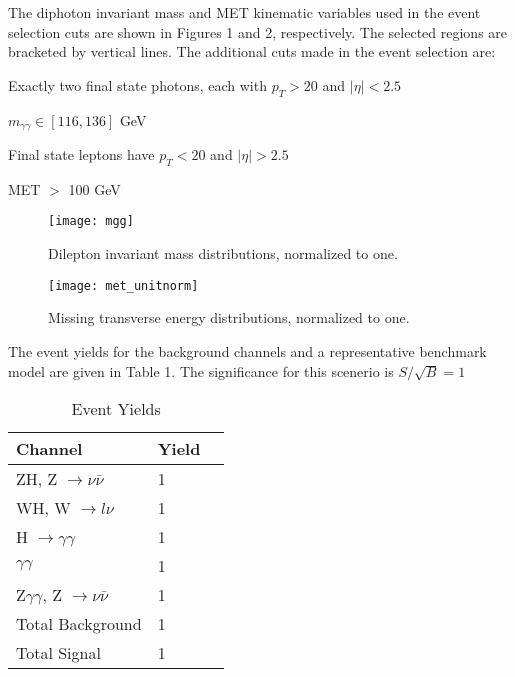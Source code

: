 \documentclass[twoside]{article}
\begin{document}
\begin{multicols}{2}
The diphoton invariant mass and MET kinematic variables used in the event selection cuts are shown in Figures 1 and 2, respectively. The selected regions are bracketed by vertical lines. The additional cuts made in the event selection are: \\
 
\begin{compactitem}
\item Exactly two final state photons, each with $p_{T} > 20$ and $|\eta| < 2.5$
\item $m_{\gamma\gamma} \in [116, 136]$ GeV
\item Final state leptons have $p_{T} < 20$ and $|\eta| > 2.5$
\item MET $>$ 100 GeV
\end{compactitem}

\begin{figure}[H]
\centering
\texttt{[image: mgg]}
\caption{Dilepton invariant mass distributions, normalized to one.}
\end{figure}

\begin{figure}[H]
\centering
\texttt{[image: met\_unitnorm]}
\caption{Missing transverse energy distributions, normalized to one.}
\end{figure}

The event yields for the background channels and a representative benchmark model are given in Table 1. The significance for this scenerio is $S / \sqrt{B} = 1$ \\

\begin{table}[H]
\centering
\begin{tabular}{llr}
\toprule
Channel & Yield \\
\midrule
ZH, Z $\rightarrow \nu \bar{\nu}$ & 1 \\
WH, W $\rightarrow l \nu$ & 1 \\
H $\rightarrow \gamma \gamma$ & 1 \\
$\gamma \gamma$ & 1 \\
Z$\gamma\gamma$, Z $\rightarrow \nu \bar{\nu}$ & 1 \\
\midrule
Total Background & 1\\
Total Signal & 1\\
\bottomrule
\end{tabular}
\caption{Event Yields}
\end{table}


\end{multicols}
\end{document}
